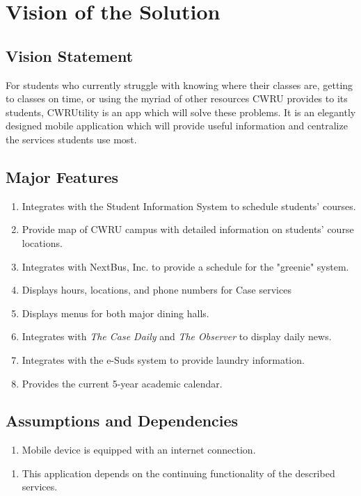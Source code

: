 \documentclass[pdftex,12pt,letter]{article}
\begin{document}
\section{Vision of the Solution}
\subsection{Vision Statement}
For students who currently struggle with knowing where their classes are, getting to classes on time, or using the myriad of other resources CWRU provides to its students, CWRUtility is an app which will solve these problems. It is an elegantly designed mobile application which will provide useful information and centralize the services students use most.
\subsection{Major Features}
\begin{enumerate}[FE-1:]
\item Integrates with the Student Information System to schedule students' courses.
\item Provide map of CWRU campus with detailed information on students' course locations.
\item Integrates with NextBus, Inc. to provide a schedule for the "greenie" system.
\item Displays hours, locations, and phone numbers for Case services
\item Displays menus for both major dining halls.
\item Integrates with \emph{The Case Daily} and \emph{The Observer} to display daily news.
\item Integrates with the e-Suds system to provide laundry information.
\item Provides the current 5-year academic calendar.
\end{enumerate} 
\subsection{Assumptions and Dependencies}
\begin{enumerate}[{A}S-1:]
\item Mobile device is equipped with an internet connection.
\end{enumerate}
\begin{enumerate}[DE-1:]
\item This application depends on the continuing functionality of the described services.
\end{enumerate}
\end{document}
